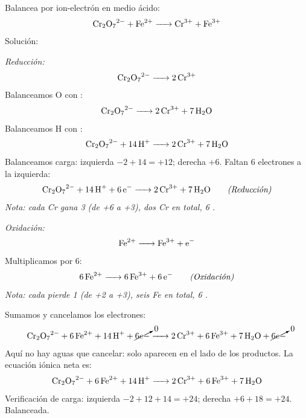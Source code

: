\begin{exercise}{}{}
Balancea por ion-electrón en medio ácido:
\[
\ce{Cr2O7^{2-} + Fe^{2+} -> Cr^{3+} + Fe^{3+}}
\]
Solución:

\textit{Reducción:}
\[
\ce{Cr2O7^{2-} -> 2Cr^{3+}}
\]
Balanceamos O con :
\[
\ce{Cr2O7^{2-} -> 2Cr^{3+} + 7H2O}
\]
Balanceamos H con :
\[
\ce{Cr2O7^{2-} + 14H+ -> 2Cr^{3+} + 7H2O}
\]
Balanceamos carga: izquierda $-2+14 = +12$; derecha $+6$.
Faltan 6 electrones a la izquierda:
\begin{equation*}
\ce{Cr2O7^{2-} + 14H+ + 6e- -> 2Cr^{3+} + 7H2O} \tag*{\textit{(Reducción)}}
\end{equation*}
\textit{Nota: cada Cr gana 3  (de +6 a +3), dos Cr en total, 6 .}

\textit{Oxidación:}
\[
\ce{Fe^{2+} -> Fe^{3+} + e-}
\]
Multiplicamos por 6:
\begin{equation*}
\ce{6Fe^{2+} -> 6Fe^{3+} + 6e-} \tag*{\textit{(Oxidación)}}
\end{equation*}
\textit{Nota: cada  pierde 1  (de +2 a +3), seis Fe en total, 6 .}

Sumamos y cancelamos los electrones:
\[
\ce{
Cr2O7^{2-} + 6Fe^{2+} + 14H+ + \cancelto{0}{6e-}
-> 2Cr^{3+} + 6Fe^{3+} + 7H2O + \cancelto{0}{6e-}
}
\]
Aquí no hay aguas que cancelar: solo aparecen en el lado de los
productos. La ecuación iónica neta es:
\[
\ce{Cr2O7^{2-} + 6Fe^{2+} + 14H+ -> 2Cr^{3+} + 6Fe^{3+} + 7H2O}
\]
Verificación de carga: izquierda $-2+12+14 = +24$; derecha
$+6+18 = +24$. Balanceada.
\end{exercise}

